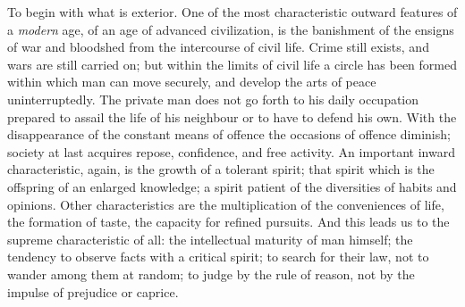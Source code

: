 To begin with what is exterior. One of the most characteristic outward
features of a \emph{modern} age, of an age of advanced civilization, is
the banishment of the ensigns of war and bloodshed from the intercourse
of civil life. Crime still exists, and wars are still carried on; but
within the limits of civil life a circle has been formed within which
man can move securely, and develop the arts of peace uninterruptedly.
The private man does not go forth to his daily occupation prepared to
assail the life of his neighbour or to have to defend his own. With the
disappearance of the constant means of offence the occasions of offence
diminish; society at last acquires repose, confidence, and free
activity. An important inward characteristic, again, is the growth of a
tolerant spirit; that spirit which is the offspring of an enlarged
knowledge; a spirit patient of the diversities of habits and opinions.
Other characteristics are the multiplication of the conveniences of
life, the formation of taste, the capacity for refined pursuits. And
this leads us to the supreme characteristic of all: the intellectual
maturity of man himself; the tendency to observe facts with a critical
spirit; to search for their law, not to wander among them at random; to
judge by the rule of reason, not by the impulse of prejudice or caprice.

